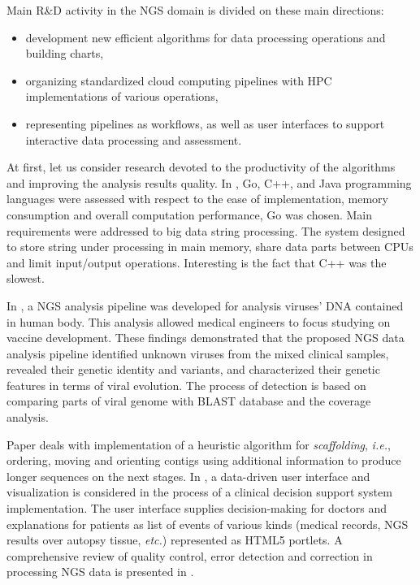 \documentclass[a4paper]{jpconf}
\begin{document}
Main R\&D activity in the NGS domain is divided on these main directions:
\begin{itemize}
\item development new efficient algorithms for data processing operations and building charts,
\item organizing standardized cloud computing pipelines with HPC implementations of various operations,
\item representing pipelines as workflows, as well as user interfaces to support interactive data processing and assessment.
\end{itemize}

At first, let us consider research devoted to the productivity of the algorithms and improving the analysis results quality.  In \cite{const19}, Go, C++, and Java programming languages were assessed with respect to the ease of implementation, memory consumption and overall computation performance, Go was chosen. Main requirements were addressed to big data string processing. The system designed to store string under processing in main memory, share data parts between CPUs and limit input/output operations. Interesting is the fact that C++ was the slowest.

In \cite{Gong16}, a NGS analysis pipeline was developed for analysis viruses' DNA contained in human body. This analysis allowed medical engineers to focus studying on vaccine development. These findings demonstrated that the proposed NGS data analysis pipeline identified unknown viruses from the mixed clinical samples, revealed their genetic identity and variants, and characterized their genetic features in terms of viral evolution. The process of detection is based on comparing parts of viral genome with BLAST database and the coverage analysis.

Paper \cite{grass12} deals with implementation of a heuristic algorithm for \emph{scaffolding}, \emph{i.e.}, ordering, moving and orienting contigs using additional information to produce longer sequences on the next stages.
In \cite{muller16}, a data-driven user interface and visualization is considered in the process of a clinical decision support system implementation. The user interface supplies decision-making for doctors and explanations for patients as list of events of various kinds (medical records, NGS results over autopsy tissue, \emph{etc.}) represented as HTML5 portlets. A comprehensive review of quality control, error detection and correction in processing NGS data is presented in \cite{te16}. %
\end{document}
